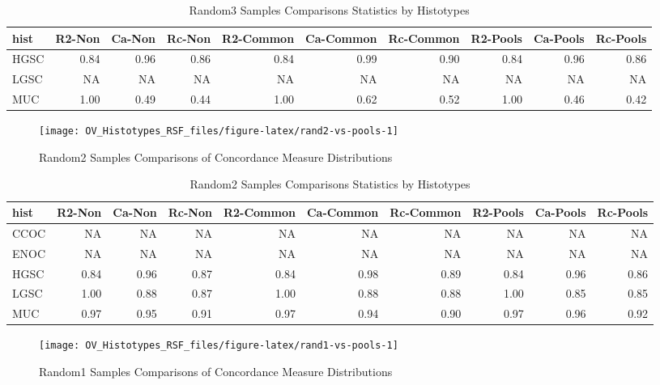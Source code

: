 \documentclass[
]{report}
\begin{document}
\begin{table}

\caption{\label{tab:rand3-vs-pools-stats}Random3 Samples Comparisons Statistics by Histotypes}
\centering
\begin{tabular}[t]{l|r|r|r|r|r|r|r|r|r}
\hline
hist & R2-Non & Ca-Non & Rc-Non & R2-Common & Ca-Common & Rc-Common & R2-Pools & Ca-Pools & Rc-Pools\\
\hline
HGSC & 0.84 & 0.96 & 0.86 & 0.84 & 0.99 & 0.90 & 0.84 & 0.96 & 0.86\\
\hline
LGSC & NA & NA & NA & NA & NA & NA & NA & NA & NA\\
\hline
MUC & 1.00 & 0.49 & 0.44 & 1.00 & 0.62 & 0.52 & 1.00 & 0.46 & 0.42\\
\hline
\end{tabular}
\end{table}

\begin{figure}[H]

{\centering \texttt{[image: OV\_Histotypes\_RSF\_files/figure-latex/rand2-vs-pools-1]} 

}

\caption{Random2 Samples Comparisons of Concordance Measure Distributions}\label{fig:rand2-vs-pools}
\end{figure}

\begin{table}

\caption{\label{tab:rand2-vs-pools-stats}Random2 Samples Comparisons Statistics by Histotypes}
\centering
\begin{tabular}[t]{l|r|r|r|r|r|r|r|r|r}
\hline
hist & R2-Non & Ca-Non & Rc-Non & R2-Common & Ca-Common & Rc-Common & R2-Pools & Ca-Pools & Rc-Pools\\
\hline
CCOC & NA & NA & NA & NA & NA & NA & NA & NA & NA\\
\hline
ENOC & NA & NA & NA & NA & NA & NA & NA & NA & NA\\
\hline
HGSC & 0.84 & 0.96 & 0.87 & 0.84 & 0.98 & 0.89 & 0.84 & 0.96 & 0.86\\
\hline
LGSC & 1.00 & 0.88 & 0.87 & 1.00 & 0.88 & 0.88 & 1.00 & 0.85 & 0.85\\
\hline
MUC & 0.97 & 0.95 & 0.91 & 0.97 & 0.94 & 0.90 & 0.97 & 0.96 & 0.92\\
\hline
\end{tabular}
\end{table}

\begin{figure}[H]

{\centering \texttt{[image: OV\_Histotypes\_RSF\_files/figure-latex/rand1-vs-pools-1]} 

}

\caption{Random1 Samples Comparisons of Concordance Measure Distributions}\label{fig:rand1-vs-pools}
\end{figure}
\end{document}

